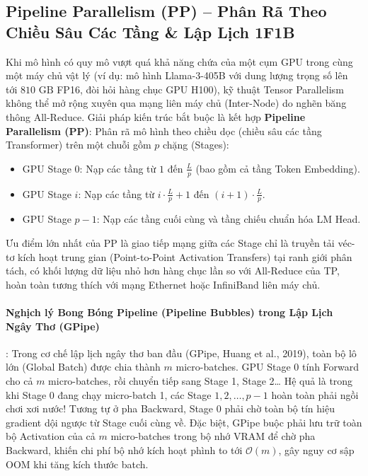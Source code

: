 \subsection{Pipeline Parallelism (PP) -- Phân Rã Theo Chiều Sâu Các Tầng \& Lập Lịch 1F1B}
\label{sec:pipeline-parallelism-1f1b}

Khi mô hình có quy mô vượt quá khả năng chứa của một cụm GPU trong cùng một máy chủ vật lý (ví dụ: mô hình Llama-3-405B với dung lượng trọng số lên tới $810\text{ GB}$ FP16, đòi hỏi hàng chục GPU H100), kỹ thuật Tensor Parallelism không thể mở rộng xuyên qua mạng liên máy chủ (Inter-Node) do nghẽn băng thông All-Reduce.
Giải pháp kiến trúc bắt buộc là kết hợp \textbf{Pipeline Parallelism (PP)}: Phân rã mô hình theo chiều dọc (chiều sâu các tầng Transformer) trên một chuỗi gồm $p$ chặng (Stages):
\begin{itemize}
  \item GPU Stage $0$: Nạp các tầng từ $1$ đến $\frac{L}{p}$ (bao gồm cả tầng Token Embedding).
  \item GPU Stage $i$: Nạp các tầng từ $i \cdot \frac{L}{p} + 1$ đến $(i+1) \cdot \frac{L}{p}$.
  \item GPU Stage $p-1$: Nạp các tầng cuối cùng và tầng chiếu chuẩn hóa LM Head.
\end{itemize}
Ưu điểm lớn nhất của PP là giao tiếp mạng giữa các Stage chỉ là truyền tải véc-tơ kích hoạt trung gian (Point-to-Point Activation Transfers) tại ranh giới phân tách, có khối lượng dữ liệu nhỏ hơn hàng chục lần so với All-Reduce của TP, hoàn toàn tương thích với mạng Ethernet hoặc InfiniBand liên máy chủ.

\paragraph{Nghịch lý Bong Bóng Pipeline (Pipeline Bubbles) trong Lập Lịch Ngây Thơ (GPipe)}:
Trong cơ chế lập lịch ngây thơ ban đầu (GPipe, Huang et al., 2019), toàn bộ lô lớn (Global Batch) được chia thành $m$ micro-batches.
GPU Stage 0 tính Forward cho cả $m$ micro-batches, rồi chuyển tiếp sang Stage 1, Stage 2\dots
Hệ quả là trong khi Stage 0 đang chạy micro-batch 1, các Stage $1, 2, \dots, p-1$ hoàn toàn phải ngồi chơi xơi nước! Tương tự ở pha Backward, Stage 0 phải chờ toàn bộ tín hiệu gradient dội ngược từ Stage cuối cùng về.
Đặc biệt, GPipe buộc phải lưu trữ toàn bộ Activation của cả $m$ micro-batches trong bộ nhớ VRAM để chờ pha Backward, khiến chi phí bộ nhớ kích hoạt phình to tới $\mathcal{O}(m)$, gây nguy cơ sập OOM khi tăng kích thước batch.

